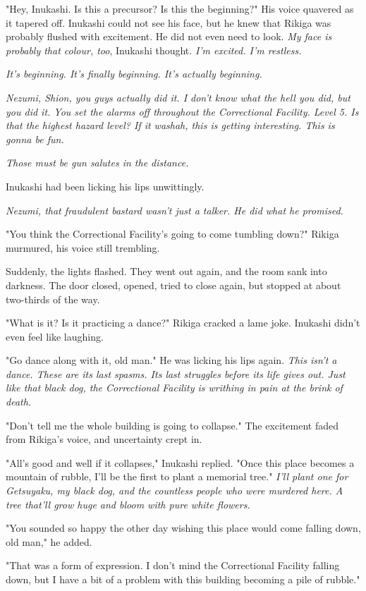 "Hey, Inukashi. Is this a precursor? Is this the beginning?" His voice
quavered as it tapered off. Inukashi could not see his face, but he knew
that Rikiga was probably flushed with excitement. He did not even need
to look. \emph{My face is probably that colour, too}, Inukashi thought. \emph{I'm
excited. I'm restless.}

\emph{It's beginning. It's finally beginning. It's actually beginning.}

\emph{Nezumi, Shion, you guys actually did it. I don't know what the hell you
did, but you did it. You set the alarms off throughout the Correctional
Facility. Level 5. Is that the highest hazard level? If it was\el hah,
this is getting interesting. This is gonna be fun.}

\emph{Those must be gun salutes in the distance.}

Inukashi had been licking his lips unwittingly.

\emph{Nezumi, that fraudulent bastard wasn't just a talker. He did what he
promised.}

"You think the Correctional Facility's going to come tumbling down?"
Rikiga murmured, his voice still trembling.

Suddenly, the lights flashed. They went out again, and the room sank
into darkness. The door closed, opened, tried to close again, but
stopped at about two-thirds of the way.

"What is it? Is it practicing a dance?" Rikiga cracked a lame joke.
Inukashi didn't even feel like laughing.

"Go dance along with it, old man." He was licking his lips again. \emph{This
isn't a dance. These are its last spasms. Its last struggles before its
life gives out. Just like that black dog, the Correctional Facility is
writhing in pain at the brink of death.}

"Don't tell me the whole building is going to collapse." The excitement
faded from Rikiga's voice, and uncertainty crept in.

"All's good and well if it collapses," Inukashi replied. "Once this
place becomes a mountain of rubble, I'll be the first to plant a
memorial tree." \emph{I'll plant one for Getsuyaku, my black dog, and the
countless people who were murdered here. A tree that'll grow huge and
bloom with pure white flowers.}

"You sounded so happy the other day wishing this place would come
falling down, old man," he added.

"That was a form of expression. I don't mind the Correctional Facility
falling down, but I have a bit of a problem with this building becoming
a pile of rubble."

